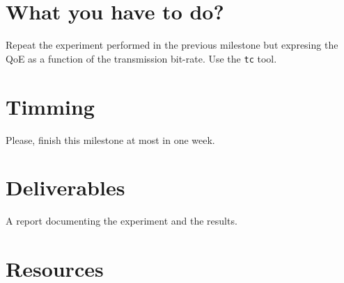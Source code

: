 \section{What you have to do?}

Repeat the experiment performed in the previous milestone but
expresing the QoE as a function of the transmission bit-rate. Use the
\verb|tc| tool.

\section{Timming}

Please, finish this milestone at most in one week.

\section{Deliverables}

A report documenting the experiment and the results.


\section{Resources}


